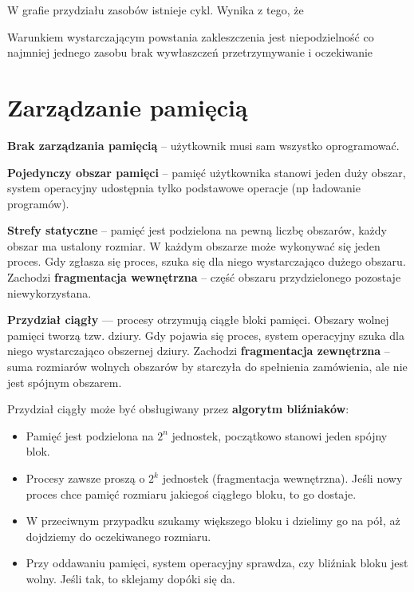 \begin{problems}
    \prob W grafie przydziału zasobów istnieje cykl. Wynika z tego, że
    
    \prob Warunkiem wystarczającym powstania zakleszczenia jest
    \answers
    {niepodzielność co najmniej jednego zasobu}
    {brak wywłaszczeń}
    {przetrzymywanie i oczekiwanie}
\end{problems}

\section{Zarządzanie pamięcią}
\textbf{Brak zarządzania pamięcią} -- użytkownik musi sam wszystko oprogramować.

\textbf{Pojedynczy obszar pamięci} -- pamięć użytkownika stanowi jeden duży obszar, system operacyjny udostępnia tylko podstawowe operacje (np ładowanie programów).

\textbf{Strefy statyczne} -- pamięć jest podzielona na pewną liczbę obszarów, każdy obszar ma ustalony rozmiar. W każdym obszarze może wykonywać się jeden proces. Gdy zgłasza się proces, szuka się dla niego wystarczająco dużego obszaru. Zachodzi \textbf{fragmentacja wewnętrzna} -- część obszaru przydzielonego pozostaje niewykorzystana.

\textbf{Przydział ciągły} --- procesy otrzymują ciągłe bloki pamięci. Obszary wolnej pamięci tworzą tzw. dziury. Gdy pojawia się proces, system operacyjny szuka dla niego wystarczająco obszernej dziury.
Zachodzi \textbf{fragmentacja zewnętrzna} -- suma rozmiarów wolnych obszarów by starczyła do spełnienia zamówienia, ale nie jest spójnym obszarem.

Przydział ciągły może być obsługiwany przez \textbf{algorytm bliźniaków}:
\begin{itemize}
    \vspace{-6pt} \item Pamięć jest podzielona na $2^n$ jednostek, początkowo stanowi jeden spójny blok. 
    \vspace{-6pt} \item Procesy zawsze proszą o $2^k$ jednostek (fragmentacja wewnętrzna). Jeśli nowy proces chce pamięć rozmiaru jakiegoś ciągłego bloku, to go dostaje. 
    \vspace{-6pt} \item W przeciwnym przypadku szukamy większego bloku i dzielimy go na pół, aż dojdziemy do oczekiwanego rozmiaru. 
    \vspace{-6pt} \item Przy oddawaniu pamięci, system operacyjny sprawdza, czy bliźniak bloku jest wolny. Jeśli tak, to sklejamy dopóki się da. 
\end{itemize}


